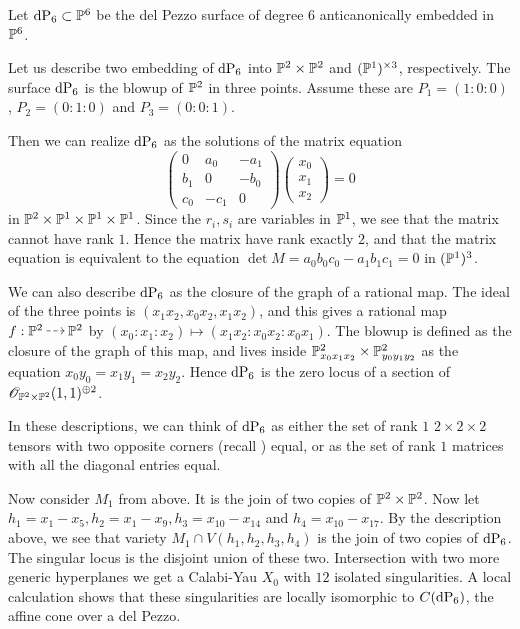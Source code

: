 \documentclass[11pt, english]{article}
\begin{document}
Let $\dP6 \subset \PP^6$ be the del Pezzo surface of degree $6$ anticanonically embedded in $\mathbb{P}^6$.

Let us describe two embedding of $\dP6$ into $\mathbb{P}^2 \times \mathbb{P}^2$ and $(\mathbb{P}^1)^{\times 3}$, respectively. The surface $\dP6$ is the blowup of $\mathbb{P}^2$ in three points. Assume these are $P_1=(1:0:0)$, $P_2= (0:1:0)$ and $P_3=(0:0:1)$.

Then we can realize $\dP6$ as the solutions of the matrix equation
\[
\begin{pmatrix}
0 & a_0 & -a_1 \\  %
b_1 & 0 & -b_0 \\
c_0 & -c_1 & 0
\end{pmatrix}
\begin{pmatrix}
x_0 \\ x_1 \\ x_2
\end{pmatrix} = 0
\]
in $\mathbb P^2 \times \mathbb{P}^1 \times \mathbb{P}^1 \times \mathbb{P}^1$. Since the $r_i,s_i$ are variables in $\mathbb{P}^1$, we see that the matrix cannot have rank $1$. Hence the matrix have rank exactly $2$, and that the matrix equation is equivalent to the equation $\det M =a_0b_0c_0-a_1b_1c_1= 0$ in $(\mathbb{P}^1)^3$. 

We can also describe $\dP6$ as the closure of the graph of a rational map. The ideal of the three points is $(x_1x_2,x_0x_2,x_1x_2)$, and this gives a rational map $f: \PP^2 \rmap  \PP^2$ by $(x_0:x_1:x_2) \mapsto (x_1x_2:x_0x_2:x_0x_1)$. The blowup is defined as the closure of the graph of this map, and lives inside $\mathbb{P}^2_{x_0x_1x_2} \times \mathbb{P}^2_{y_0y_1y_2}$ as the equation $x_0y_0=x_1y_1=x_2y_2$. Hence $\dP6$ is the zero locus of a section of $\mathscr O_{\mathbb{P}^2 \times \mathbb{P}^2}(1,1)^{\oplus 2}$.

In these descriptions, we can think of $\dP6$ as either the set of rank $1$ $2 \times 2 \times 2$ tensors with two opposite corners (recall ) equal, or as the set of rank $1$ matrices with all the diagonal entries equal.

Now consider $M_1$ from above. It is the join of two copies of $\mathbb{P}^2 \times \mathbb{P}^2$. Now let $h_1=x_1-x_5,h_2=x_1-x_9,h_3=x_{10}-x_{14}$ and $h_4=x_{10}-x_{17}$. By the description above, we see that variety $M_1 \cap V(h_1,h_2,h_3,h_4)$ is the join of two copies of $\dP6$. The singular locus is the disjoint union of these two. Intersection with two more generic hyperplanes we get a Calabi-Yau $X_0$ with $12$ isolated singularities. A local calculation shows that these singularities are locally isomorphic to $C(\dP6)$, the affine cone over a del Pezzo. 
\end{document}
